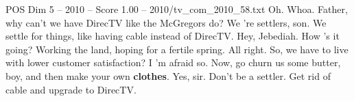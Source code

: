 \begin{textsample}{POS Dim 5 – 2010 – Score 1.00 – 2010/tv\_com\_2010\_58.txt}  \label{ex:f5_pos_079}
Oh.
Whoa.
Father, why can't we have DirecTV like the McGregors do?
We 're settlers, son.
We settle for things, like having cable instead of DirecTV.
Hey, Jebediah.
How 's it going?
Working the land, hoping for a fertile spring.
All right.
So, we have to live with lower customer satisfaction?
I 'm afraid so.
Now, go churn us some butter, boy, and then make your own \textbf{clothes}.
Yes, sir.
Don't be a settler.
Get rid of cable and upgrade to DirecTV.

\end{textsample}
